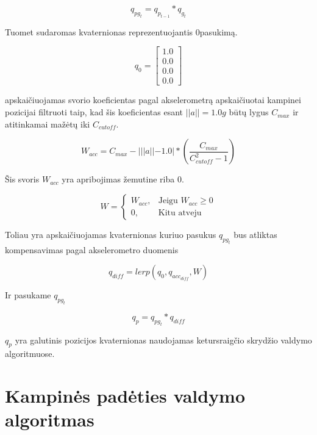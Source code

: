 \documentclass[12pt, a4paper, lithuanian, final]{article}
\begin{document}
\begin{equation}
	q_{pg_t} = q_{p_{t-1}} * q_{g_t}
\end{equation}

Tuomet sudaromas kvaternionas reprezentuojantis 0\degree pasukimą.

\begin{equation}
	q_{0} = \left[
		\begin{array}{c}
			1.0 \\
			0.0 \\
			0.0 \\
			0.0
		\end{array}
	\right]
\end{equation}

apskaičiuojamas svorio koeficientas pagal akselerometrą apskaičiuotai kampinei pozicijai filtruoti taip, kad šis koeficientas esant $||a|| = 1.0g$ būtų lygus $C_{max}$ ir atitinkamai mažėtų iki $C_{cutoff}$.

\begin{equation}
	W_{acc} = C_{max} - | ||a|| - 1.0 | * (\dfrac{C_{max}}{C_{cutoff}^2 - 1} )
\end{equation}

Šis svoris $W_{acc}$ yra apribojimas žemutine riba 0.

\begin{equation}
	W = \begin{cases}
		W_{acc}, & \text{Jeigu } W_{acc} \geq 0\\
		0, & \text{Kitu atveju}
	\end{cases}
\end{equation}


Toliau yra apskaičiuojamas kvaternionas kuriuo pasukus $q_{pg_t}$ bus atliktas kompensavimas pagal akselerometro duomenis

\begin{equation}
	q_{diff} = lerp(q_{0}, q_{acc_{diff}}, W)
\end{equation}

Ir pasukame $q_{pg_t}$

\begin{equation}
	q_{p} = q_{pg_t} * q_{diff}
\end{equation}

$q_{p}$ yra galutinis pozicijos kvaternionas naudojamas ketursraigčio skrydžio valdymo algoritmuose.





\section{Kampinės padėties valdymo algoritmas}
\label{skyr-attitudeCtrl}
\end{document}
